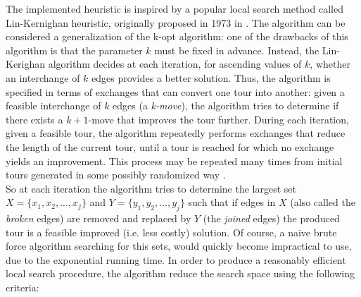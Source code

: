 The implemented heuristic is inspired by a popular local search method called Lin-Kernighan heuristic, originally proposed in 1973 in \cite{LinK73}. The algorithm can be considered a generalization of the k-opt algorithm: one of the drawbacks of this algorithm is that the parameter $k$ must be fixed in advance. Instead, the Lin-Kerighan algorithm decides at each iteration, for ascending values of $k$, whether an interchange of $k$ edges provides a better solution. Thus, the algorithm is specified in terms of exchanges that can convert one tour into another: given a feasible interchange of $k$ edges (a \textit{k-move}), the algorithm tries to determine if there exists a $k+1$-move that improves the tour further. 
During each iteration, given a feasible tour, the algorithm repeatedly performs exchanges that reduce the length of the current tour, until a tour is reached for which no exchange yields an improvement. This process may be repeated many times from initial tours generated in some possibly randomized way \cite{Helsgaun2000}.\\
So at each iteration the algorithm tries to determine the largest set $X=\{x_1, x_2, ..., x_j\}$ and $Y=\{y_1, y_2, ..., y_j\}$ such that if edges in $X$ (also called the \emph{broken} edges) are removed and replaced by $Y$ (the \emph{joined} edges) the produced tour is a feasible improved (i.e. less costly) solution. Of course, a naive brute force algorithm searching for this sets, would quickly become impractical to use, due to the exponential running time. In order to produce a reasonably efficient local search procedure, the algorithm reduce the search space using the following criteria:

